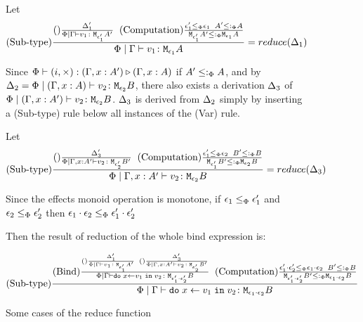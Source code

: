 \documentclass{Report}
\begin{document}
\begin{figure}
\begin{framed}
    Let \begin{equation}
        (\text{Sub-type}) \frac{
            (\text{}) \frac{\Delta'_1}{\Phi\mid\Gamma \vdash v_1 \colon \texttt{M}_{\epsilon'_1}{A'}}
        \;\;
        (\text{Computation}) \frac{ \epsilon_1'\leq_{\Phi} \epsilon_1\;\; A' \leq:_\Phi A }{\texttt{M}_{\epsilon_1'}{ A' }\leq:_\Phi\texttt{M}_{\epsilon_1}{A}}
        }{
            \Phi\mid\Gamma \vdash v_1 \colon \texttt{M}_{\epsilon_1}{A}
        } = reduce(\Delta_1)
    \end{equation}

    Since $\Phi\vdash (i,\times) : (\Gamma, x: A') \triangleright (\Gamma, x: A)$ if $A' \leq:_\Phi A$, and by $\Delta_2 = \Phi\mid(\Gamma, x: A) \vdash v_2 \colon \texttt{M}_{\epsilon_2}{B}$, there also exists a derivation $\Delta_3$ of $\Phi\mid(\Gamma, x: A') \vdash v_2 \colon \texttt{M}_{\epsilon_2}{B}$. $\Delta_3$ is derived from $\Delta_2$ simply by inserting a (Sub-type) rule below all instances of the (Var) rule.

    Let \begin{equation}
        (\text{Sub-type}) \frac{
            (\text{}) \frac{\Delta'_3}{\Phi\mid\Gamma, x: A' \vdash v_2 \colon \texttt{M}_{\epsilon'_2}{B'}}
        \;\;
        (\text{Computation}) \frac{ \epsilon_1'\leq_{\Phi} \epsilon_2\;\; B' \leq:_\Phi B }{\texttt{M}_{\epsilon_1'}{ B' }\leq:_\Phi\texttt{M}_{\epsilon_2}{B}}
        }{
            \Phi\mid\Gamma, x: A' \vdash v_2 \colon \texttt{M}_{\epsilon_2}{B}
        } = reduce(\Delta_3)
    \end{equation}
    

    Since the effects monoid operation is monotone, if $\epsilon_1\leq_{\Phi}\epsilon_1'$ and $\epsilon_2\leq_{\Phi}\epsilon_2'$ then $\epsilon_1\cdot\epsilon_2 \leq_{\Phi} \epsilon_1'\cdot\epsilon_2'$
    


    Then the result of reduction of the whole bind expression is:


    \begin{equation}
        (\text{Sub-type}) \frac{
            (\text{Bind}) \frac{
                (\text{}) \frac{
                    \Delta'_1
                }{
                    \Phi\mid\Gamma \vdash v_1 \colon \texttt{M}_{\epsilon_1'}{A'}
                }
                \;\;
                (\text{}) \frac{
                    \Delta'_3
                }{
                    \Phi\mid\Gamma, x: A' \vdash v_2 \colon \texttt{M}_{\epsilon_2'}{B'}
                }
            }{
            \Phi\mid\Gamma \vdash \texttt{do}\; x \leftarrow v_1 \;\texttt{in}\; v_2 \colon \texttt{M}_{\epsilon_1'\cdot\epsilon_2'}{B}
            }
            \;\;
            (\text{Computation}) \frac{ \epsilon_1'\cdot\epsilon_2'\leq_{\Phi} \epsilon_1\cdot\epsilon_2\;\; B' \leq:_\Phi B }{\texttt{M}_{\epsilon_1'\cdot\epsilon_2'}{ B' }\leq:_\Phi\texttt{M}_{\epsilon_1\cdot\epsilon_2}{B}}
        }{
            \Phi\mid\Gamma \vdash \texttt{do}\; x \leftarrow v_1 \;\texttt{in}\; v_2 \colon \texttt{M}_{\epsilon_1\cdot\epsilon_2}{B}
        }
    \end{equation}
    \end{framed}

    \caption{Some cases of the reduce function}
    \label{ReduceFunctionCases}
\end{figure}
\end{document}
